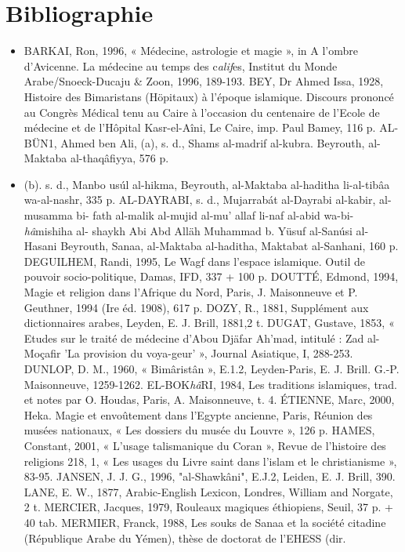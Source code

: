 \section{Bibliographie}
\begin{itemize}
    \item 

BARKAI, Ron, 1996, « Médecine, astrologie et magie », in A l'ombre d'Avicenne. La médecine au temps des c\textit{alif}es, Institut du Monde
Arabe/Snoeck-Ducaju \& Zoon, 1996, 189-193.
BEY, Dr Ahmed Issa, 1928, Histoire des Bimaristans (Höpitaux) à l'époque islamique. Discours prononcé au Congrès Médical tenu au Caire à l'occasion du centenaire de l'Ecole de médecine et de
l'Hôpital Kasr-el-Aîni, Le Caire, imp. Paul Bamey, 116 p.
AL-BÜN1, Ahmed ben Ali, (a), s. d., Shams al-madrif al-kubra.
Beyrouth, al-Maktaba al-thaqâfiyya, 576 p.
\item (b). s. d., Manbo usúl al-hikma, Beyrouth, al-Maktaba al-haditha
li-al-tibâa wa-al-nashr, 335 p.
AL-DAYRABI, s. d., Mujarrabát al-Dayrabi al-kabir, al-musamma bi-
fath al-malik al-mujid al-mu' allaf li-naf al-abid wa-bi-\textit{hâ}mishiha al-
shaykh Abi Abd Alläh Muhammad b. Yüsuf al-Sanúsi al-Hasani
Beyrouth, Sanaa, al-Maktaba al-haditha, Maktabat al-Sanhani, 160 p.
DEGUILHEM, Randi, 1995, Le Wagf dans l'espace islamique. Outil de pouvoir socio-politique, Damas, IFD, 337 + 100 p.
DOUTTÉ, Edmond, 1994, Magie et religion dans l'Afrique du Nord, Paris, J. Maisonneuve et P. Geuthner, 1994 (Ire éd. 1908), 617 p.
DOZY, R., 1881, Supplément aux dictionnaires arabes, Leyden, E. J.
Brill, 1881,2 t.
DUGAT, Gustave, 1853, « Etudes sur le traité de médecine d'Abou
Djäfar Ah'mad, intitulé : Zad al-Moçafir 'La provision du voya-geur' », Journal Asiatique, I, 288-253.
DUNLOP, D. M., 1960, « Bimâristân », E.1.2, Leyden-Paris, E. J. Brill.
G.-P. Maisonneuve, 1259-1262.
EL-BOK\textit{hâ}RI, 1984, Les traditions islamiques, trad. et notes par O.
Houdas, Paris, A. Maisonneuve, t. 4.
ÉTIENNE, Marc, 2000, Heka. Magie et envoûtement dans l'Egypte ancienne, Paris, Réunion des musées nationaux, « Les dossiers du musée du Louvre », 126 p.
HAMES, Constant, 2001, « L'usage talismanique du Coran », Revue de l'histoire des religions 218, 1, « Les usages du Livre saint dans l'islam et le christianisme », 83-95.
JANSEN, J. J. G., 1996, "al-Shawkâni", E.J.2, Leiden, E. J. Brill, 390.
LANE, E. W., 1877, Arabic-English Lexicon, Londres, William and
Norgate, 2 t.
MERCIER, Jacques, 1979, Rouleaux magiques éthiopiens, Seuil, 37 p. +
40 tab.
MERMIER, Franck, 1988, Les souks de Sanaa et la société citadine (République Arabe du Yémen), thèse de doctorat de l'EHESS (dir.

\end{itemize}
